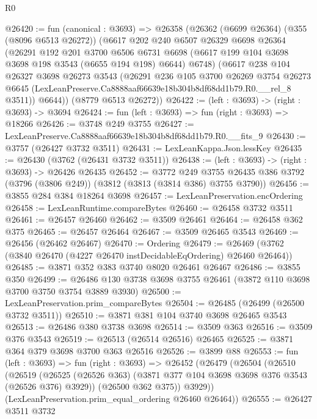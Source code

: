 \begin{lexlean}{R0}
\begin{coremodule}
@26420 := fun (canonical : @3693) =>
  @26358
    (@26362
      (@6699 @26364)
      (@355 (@8096 @6513 @26272))
      (@6617
        @202
        @240
        @6507
        @26329
        @6698
        @26364
        (@26291
          @192
          @201
          @3700
          @6506
          @6731
          @6698
          (@6617 @199 @104 @3698 @3698 @198 @3543 (@6655 @194 @198) @6644)
          @6748)
        (@6617
          @238
          @104
          @26327
          @3698
          @26273
          @3543
          (@26291
            @236
            @105
            @3700
            @26269
            @3754
            @26273
            @6645
            (LexLeanPreserve.Ca8888aaf66639e18b304b8df68dd1b79.R0.__rel_8 @3511))
          @6644))
      (@8779 @6513 @26272))
@26422 := (left : @3693) -> (right : @3693) -> @3694
@26424 := fun (left : @3693) => fun (right : @3693) => @18266
@26426 := @3748 @249 @3755
@26427 := LexLeanPreserve.Ca8888aaf66639e18b304b8df68dd1b79.R0.__fits_9
@26430 := @3757 (@26427 @3732 @3511)
@26431 := LexLeanKappa.Json.lessKey
@26435 := @26430 (@3762 (@26431 @3732 @3511))
@26438 := (left : @3693) -> (right : @3693) -> @26426 @26435
@26452 := @3772
    @249
    @3755
    @26435
    @386
    @3792
    (@3796 (@3806 @249))
    (@3812 (@3813 (@3814 @386) @3755 @3790))
@26456 := @3855 @284 @384 @18264 @3698
@26457 := LexLeanPreservation.encOrdering
@26458 := LexLeanRuntime.compareBytes
@26460 := @26458 @3732 @3511
@26461 := @26457 @26460
@26462 := @3509 @26461
@26464 := @26458 @362 @375
@26465 := @26457 @26464
@26467 := @3509 @26465 @3543
@26469 := @26456 (@26462 @26467)
@26470 := Ordering
@26479 := @26469 (@3762 (@3840 @26470 (@4227 @26470 instDecidableEqOrdering) @26460 @26464))
@26485 := @3871 @352 @383 @3740 @8020 @26461 @26467
@26486 := @3855 @350
@26499 := @26486 @130 @3738 @3698 @3755 @26461 (@3872 @110 @3698 @3700 @3750 @3754 @3889 @3930)
@26500 := LexLeanPreservation.prim_compareBytes
@26504 := @26485 (@26499 (@26500 @3732 @3511))
@26510 := @3871 @381 @104 @3740 @3698 @26465 @3543
@26513 := @26486 @380 @3738 @3698
@26514 := @3509 @363
@26516 := @3509 @376 @3543
@26519 := @26513 (@26514 @26516) @26465
@26525 := @3871 @364 @379 @3698 @3700 @363 @26516
@26526 := @3899 @88
@26553 := fun (left : @3693) =>
  fun (right : @3693) =>
  @26452
    (@26479
      (@26504
        (@26510
          (@26519
            (@26525 (@26526 @363) (@3871 @377 @104 @3698 @3698 @376 @3543 (@26526 @376) @3929))
            (@26500 @362 @375))
          @3929))
      (LexLeanPreservation.prim_equal_ordering @26460 @26464))
@26555 := @26427 @3511 @3732

\end{coremodule}
\end{lexlean}
